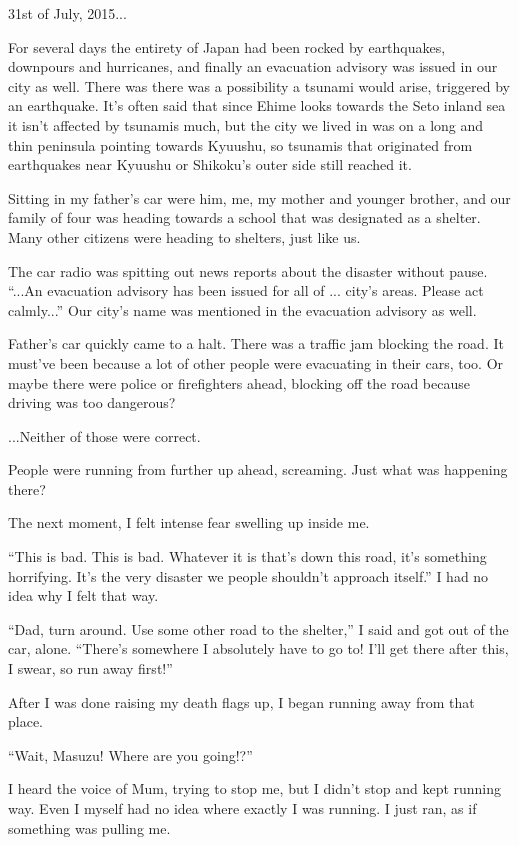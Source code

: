 
31st of July, 2015...

For several days the entirety of Japan had been rocked by earthquakes, downpours and hurricanes, and finally an evacuation advisory was issued in our city as well. There was there was a possibility a tsunami would arise, triggered by an earthquake. It's often said that since Ehime looks towards the Seto inland sea it isn't affected by tsunamis much, but the city we lived in was on a long and thin peninsula pointing towards Kyuushu, so tsunamis that originated from earthquakes near Kyuushu or Shikoku's outer side still reached it.

Sitting in my father's car were him, me, my mother and younger brother, and our family of four was heading towards a school that was designated as a shelter. Many other citizens were heading to shelters, just like us.

The car radio was spitting out news reports about the disaster without pause. ``...An evacuation advisory has been issued for all of ... city's areas. Please act calmly...'' Our city's name was mentioned in the evacuation advisory as well.

Father's car quickly came to a halt. There was a traffic jam blocking the road. It must've been because a lot of other people were evacuating in their cars, too. Or maybe there were police or firefighters ahead, blocking off the road because driving was too dangerous?

...Neither of those were correct.

People were running from further up ahead, screaming. Just what was happening there?

The next moment, I felt intense fear swelling up inside me.

``This is bad. This is bad. Whatever it is that's down this road, it's something horrifying. It's the very disaster we people shouldn't approach itself.'' I had no idea why I felt that way.

``Dad, turn around. Use some other road to the shelter,'' I said and got out of the car, alone. ``There's somewhere I absolutely have to go to! I'll get there after this, I swear, so run away first!''

After I was done raising my death flags up, I began running away from that place.

``Wait, Masuzu! Where are you going!?''

I heard the voice of Mum, trying to stop me, but I didn't stop and kept running way. Even I myself had no idea where exactly I was running. I just ran, as if something was pulling me.


